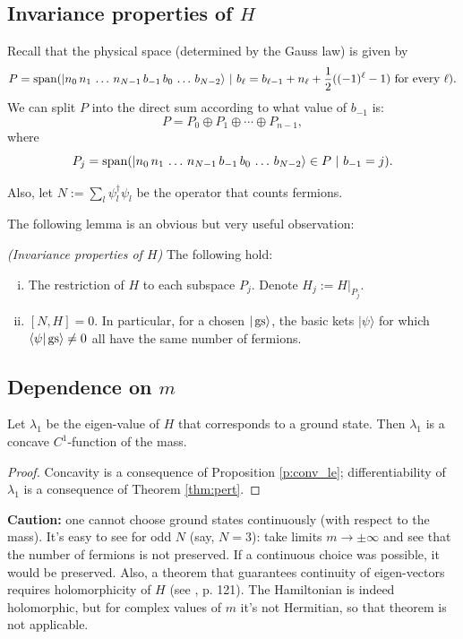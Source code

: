 
\subsection{Invariance properties of $H$}
Recall that the physical space (determined by the Gauss law) is given by
	\[
	P = \operatorname{span} ( |n_0\, n_1\, \ldots \, n_{N-1} \, b_{-1}\, b_0\, \ldots\, b_{N-2}\rangle \ | \ b_{\ell} =b_{\ell-1} + n_{\ell} + \frac{1}{2}((-1)^\ell-1) \ \text{for every} \ \ell).
	\]
	We can split $P$ into the direct sum according to what value of $b_{-1}$ is:
	\[
	P = P_0 \oplus P_1 \oplus \cdots \oplus P_{n-1},
	\]
	where
	\[
	P_j = \operatorname{span}( |n_0\, n_1\, \ldots \, n_{N-1} \, b_{-1}\, b_0\, \ldots\, b_{N-2}\rangle \in P \ | \ b_{-1} = j).
	\]

Also, let $N:= \sum_{l} \psi_l^\dagger \psi_l$ be the operator that counts fermions.

The following lemma is an obvious but very useful observation:

\begin{lemma}\emph{(Invariance properties of $H$)} The following hold:
\begin{enumerate}[(i)]
\item The restriction of $H$ to each subspace $P_j$. Denote $H_j := H|_{P_j}$.
\item $[N,H] = 0$. In particular, for a chosen $|\operatorname{gs}\rangle$, the basic kets $|\psi\rangle$ for which $\langle \psi | \operatorname{gs} \rangle \neq 0$ all have the same number of fermions.
\end{enumerate}
\end{lemma}
\subsection{Dependence on $m$}
\begin{proposition}\label{p:dep_m}
Let $\lambda_1$ be the eigen-value of $H$ that corresponds to a ground state. Then $\lambda_1$ is a concave $C^1$-function of the mass. 
\end{proposition}
\begin{proof}
Concavity is a consequence of Proposition \ref{p:conv_le}; differentiability of $\lambda_1$ is a consequence of Theorem \ref{thm:pert}.
\end{proof}

\noindent \textbf{Caution:} one cannot choose ground states continuously (with respect to the mass). It's easy to see for odd $N$ (say, $N=3$): take limits $m\rightarrow \pm \infty$ and see that the number of fermions is not preserved. If a continuous choice was possible, it would be preserved. Also, a theorem that guarantees continuity of eigen-vectors requires holomorphicity of $H$ (see \cite{kato}, p. 121). The Hamiltonian is indeed holomorphic, but for complex values of $m$ it's not Hermitian, so that theorem is not applicable.

